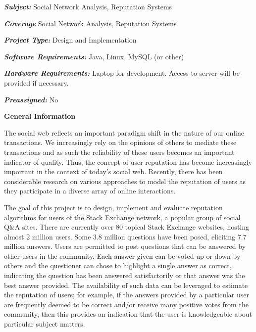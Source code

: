 \documentclass[]{final_report}
\begin{document}
\maketitle

\begin{specification}

\textbf{\textsl{Subject:}} Social Network Analysis, Reputation Systems

\textbf{\textsl{Coverage}} Social Network Analysis, Reputation Systems

\textbf{\textsl{Project Type:}} Design and Implementation

\textbf{\textsl{Software Requirements:}} Java, Linux, MySQL (or other)

\textbf{\textsl{Hardware Requirements:}} Laptop for development. Access to server will be provided if necessary.

\textbf{\textsl{Preassigned:}} No


\textbf{General Information}

The social web reflects an important paradigm shift in the nature of our online transactions. We increasingly rely on the opinions of others to mediate these transactions and as such the reliability of these users becomes an important indicator of quality. Thus, the concept of user reputation has become increasingly important in the context of today's social web. Recently, there has been considerable research on various approaches to model the reputation of users as they participate in a diverse array of online interactions.

The goal of this project is to design, implement and evaluate reputation algorithms for users of the Stack Exchange network, a popular group of social Q\&A sites. There are currently over 80 topical Stack Exchange websites, hosting almost 2 million users. Some 3.8 million questions have been posed, eliciting 7.7 million answers. Users are permitted to post questions that can be answered by other users in the community. Each answer given can be voted up or down by others and the questioner can chose to highlight a single answer as correct, indicating the question has been answered satisfactorily or that answer was the best answer provided. The availability of such data can be leveraged to estimate the reputation of users; for example, if the answers provided by a particular user are frequently deemed to be correct and/or receive many positive votes from the community, then this provides an indication that the user is knowledgeable about particular subject matters.


\end{specification}
\end{document}

